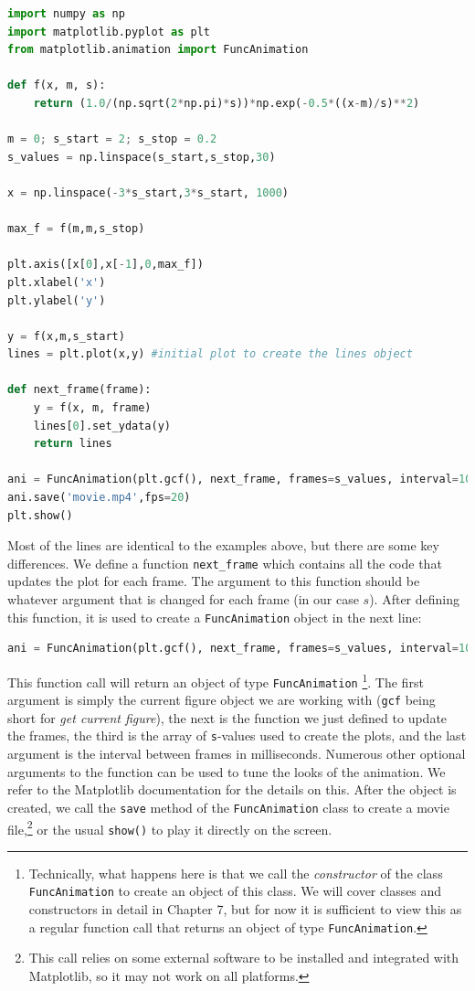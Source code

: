 \documentclass[graybox,envcountchap,sectrefs,final]{svmonodo}
\begin{document}
\begin{lstlisting}[language=Python,style=blue1]
import numpy as np
import matplotlib.pyplot as plt
from matplotlib.animation import FuncAnimation

def f(x, m, s):
    return (1.0/(np.sqrt(2*np.pi)*s))*np.exp(-0.5*((x-m)/s)**2)

m = 0; s_start = 2; s_stop = 0.2
s_values = np.linspace(s_start,s_stop,30)

x = np.linspace(-3*s_start,3*s_start, 1000)

max_f = f(m,m,s_stop)

plt.axis([x[0],x[-1],0,max_f])
plt.xlabel('x')
plt.ylabel('y')

y = f(x,m,s_start)
lines = plt.plot(x,y) #initial plot to create the lines object

def next_frame(frame):
    y = f(x, m, frame)
    lines[0].set_ydata(y)
    return lines

ani = FuncAnimation(plt.gcf(), next_frame, frames=s_values, interval=100)
ani.save('movie.mp4',fps=20)
plt.show()
\end{lstlisting}
Most of the lines are identical to the examples above, but there are some key differences. We define a function
\Verb!next_frame! which contains all the code that updates the plot for each frame. The argument to this function
should be whatever argument that is changed for each frame (in our case $s$). After defining this function,
it is used to create a \texttt{FuncAnimation} object in the next line:
\begin{lstlisting}[language=Python,style=blue1]
ani = FuncAnimation(plt.gcf(), next_frame, frames=s_values, interval=100)
\end{lstlisting}
This function call will return an object of type \texttt{FuncAnimation} \footnote{Technically, what happens here is that we call the \emph{constructor} of the class \texttt{FuncAnimation} to create an object of this class. We will cover classes and constructors in detail in Chapter 7, but for now it is sufficient to view this as a regular function call that returns an object of type \texttt{FuncAnimation}.}.
The first argument is simply the current figure object we are working with
(\texttt{gcf} being short for \emph{get current figure}), the next is the function
we just defined to update the frames, the third is the array of \texttt{s}-values used
to create the plots, and the last argument is the interval between frames in milliseconds.
Numerous other optional arguments to the function can be used to tune the looks of the animation. We refer to the
Matplotlib documentation for the details on this.
After the object is created, we call the \texttt{save} method of the \texttt{FuncAnimation} class to create a movie file,\footnote{This call relies on some external software to be installed and integrated with Matplotlib, so it may not work on all platforms.}
or the usual \texttt{show()} to play it directly on the screen.
\end{document}
